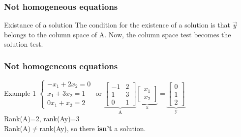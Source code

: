 \begin{frame}
	\frametitle{Not homogeneous equations}
	\begin{block}{Existance of a solution}
		The condition for the existence of a solution is that $\overrightarrow{y}$ belongs to the column space of A. Now, the column space test becomes the solution test.\\
	\end{block}
\end{frame}

\begin{frame}
	\frametitle{Not homogeneous equations}
	\begin{block}{Example 1}
		$\begin{cases}
		-x_1+2x_2=0\\
		x_1+3x_2=1\\
		0x_1+x_2=2
		\end{cases}$ or $\underbrace{\begin{bmatrix}
		-1 & 2 \\
		1 & 3\\
		0 & 1
		\end{bmatrix}}_\text{A} \underbrace{\begin{bmatrix}
		x_1\\
		x_2
		\end{bmatrix}}_\text{x}=\underbrace{\begin{bmatrix}
		0\\1\\2
		\end{bmatrix}}_\text{y}$\\
	Rank(A)=2, rank(Ay)=3 \\
	Rank(A)$\neq$rank(Ay), so there \textbf{isn't} a solution.
	\end{block}
\end{frame}

